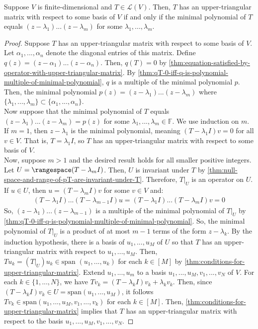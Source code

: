 \documentclass{article}
\begin{document}
\begin{theorem}
  \label{thm:necessary-sufficient-condition-for-upper-triangular-matrix}
  Suppose $V$ is finite-dimensional and $T \in \mathcal{L}(V)$. Then,
  $T$ has an upper-triangular matrix with respect to some basis of $V$
  if and only if the minimal polynomial of $T$ equals $(z -
  \lambda_1)...(z - \lambda_m)$ for some $\lambda_1, ..., \lambda_m$.
\end{theorem}
\begin{proof}
  Suppose $T$ has an upper-triangular matrix with respect to some
  basis of $V$. Let $\alpha_1, ..., \alpha_n$ denote the diagonal
  entries of this matrix. Define $q(z) = (z - \alpha_1)...(z -
  \alpha_n)$. Then, $q(T) = 0$ by
  \cref{thm:equation-satisfied-by-operator-with-upper-triangular-matrix}. By
  \cref{thm:qT-0-iff-q-is-polynomial-multiple-of-minimal-polynomial},
  $q$ is a multiple of the minimal polynomial $p$. Then, the minimal
  polynomial $p(z) = (z - \lambda_1)...(z - \lambda_m)$ where
  $\{\lambda_1, ..., \lambda_m\} \subset \{\alpha_1, ...,
  \alpha_n\}$. \\
  Now suppose that the minimal polynomial of $T$ equals $(z -
  \lambda_1)...(z - \lambda_m) = p(z)$ for some $\lambda_1, ...,
  \lambda_m \in \mathbb{F}$. We use induction on $m$. If $m = 1$, then
  $z - \lambda_1$ is the minimal polynomial, meaning $(T - \lambda_1
  I) v = 0$ for all $v \in V$. That is, $T = \lambda_1 I$, so $T$ has
  an upper-triangular matrix with respect to some basis of $V$. \\
  Now, suppose $m > 1$ and the desired result holds for all smaller
  positive integers. Let $U = \rangespace (T - \lambda_m I)$. Then,
  $U$ is invariant under $T$ by
  \cref{thm:null-space-and-range-of-pT-are-invariant-under-T}. Therefore,
  $T|_U$ is an operator on $U$. If $u \in U$, then $u = (T - \lambda_m
  I) v$ for some $v \in V$ and:
  \begin{align*}
    (T-\lambda_1 I)...(T - \lambda_{m-1}I) u = (T - \lambda_1 I)...(T
    - \lambda_m I) v = 0
  \end{align*}
  So, $(z - \lambda_1)...(z - \lambda_{m-1})$ is a multiple of the
  minimal polynomial of $T|_U$ by
  \cref{thm:qT-0-iff-q-is-polynomial-multiple-of-minimal-polynomial}. So,
  the minimal polynomial of $T|_U$ is a product of at most $m - 1$
  terms of the form $z - \lambda_k$. By the induction hypothesis,
  there is a basis of $u_1, ..., u_M$ of $U$ so that $T$ has an
  upper-triangular matrix with respect to $u_1, ..., u_M$. Then, $Tu_k
  = (T|_U)u_k \in \text{span }(u_1, ..., u_k)$ for each $k \in [M]$ by
  \cref{thm:conditions-for-upper-triangular-matrix}. Extend $u_1, ...,
  u_m$ to a basis $u_1, ..., u_M, v_1, ..., v_N$ of $V$. For each $k
  \in \{1, ..., N\}$, we have $Tv_k = (T - \lambda_k I) v_k +
  \lambda_k v_k$. Then, since $(T - \lambda_k I) v_k \in U =
  \text{span}(u_1, ..., u_M)$, it follows $Tv_k \in \text{span}(u_1, ...,
    u_M, v_1, ..., v_k)$ for each $k \in [M]$. Then,
  \cref{thm:conditions-for-upper-triangular-matrix} implies that $T$
  has an upper-triangular matrix with respect to the basis $u_1, ...,
  u_M, v_1, ..., v_N$.
\end{proof}
\end{document}
